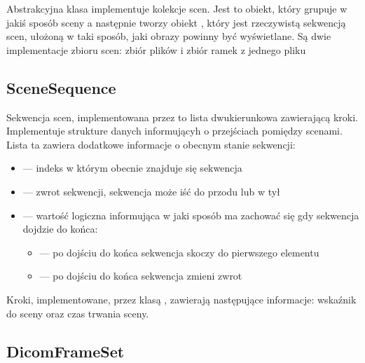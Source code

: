 \label{sec:scene-sets}

Abstrakcyjna klasa  implementuje kolekcje scen.
Jest to obiekt, który grupuje w jakiś sposób sceny a następnie tworzy obiekt , który jest rzeczywistą sekwencją scen, ułożoną w taki sposób, jaki obrazy powinny być wyświetlane.
Są dwie implementacje zbioru scen: zbiór plików i zbiór ramek z jednego pliku

\subsection{SceneSequence}

\par
Sekwencja scen, implementowana przez  to lista dwukierunkowa zawierającą kroki.
Implementuje strukture danych informującyh o przejściach pomiędzy scenami.
Lista ta zawiera dodatkowe informacje o obecnym stanie sekwencji:
\begin{itemize}
    \item {} --- indeks w którym obecnie znajduje się sekwencja
    \item {} --- zwrot sekwencji, sekwencja może iść do przodu lub w tył
    \item {} --- wartość logiczna informująca w jaki sposób ma zachować się gdy sekwencja dojdzie do końca:
    \begin{itemize}
        \item {} --- po dojściu do końca sekwencja skoczy do pierwszego elementu
        \item {} --- po dojściu do końca sekwencja zmieni zwrot
    \end{itemize}
\end{itemize}

\par
Kroki, implementowane, przez klasą , zawierają następujące informacje: wskaźnik do sceny oraz czas trwania sceny.


\subsection{DicomFrameSet}

